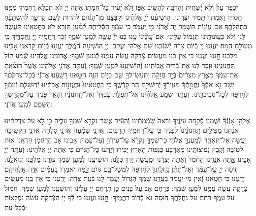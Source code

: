 \documentclass[twoside, openany, parskip=half, 11pt]{book}
\begin{document}
יְֿכַפֵּ֥ר עָוֹן֘ וְֿלֹ֢א יַ֫שְׁחִ֥ית וְֿהִרְבָּ֣ה לְֿהָשִׁ֣יב אַפּ֑וֹ וְֿלֹ֣א יָ֝עִ֗יר כׇּל־חֲמָתֽוֹ׃ אַתָּה יְיָ לֹא תִכְלָא רַחֲמֶיךָ מִמֶּֽנּוּ חַסְדְּֿךָ וַאֲמִתְּֿךָ תָּמִיד יִצְּֿרֽוּנוּ: הֽוֹשִׁיעֵ֨נוּ יְ֘יָ֤ אֱלֹהֵ֗ינוּ וְֿקַבְּֿצֵנוּ֘ מִן־הַגּ֫וֹיִ֥ם לְֿ֭הֹדוֹת לְֿשֵׁ֣ם קָדְֿשֶׁ֑ךָ לְֿ֝הִשְׁתַּבֵּ֗חַ בִּתְהִלָּתֶֽךָ׃
אִם־עֲוֹנ֥וֹת תִּשְׁמָר־יָ֑הּ אֲ֝דֹנָ֗י מִ֣י יַֽעֲמֹֽד׃ כִּֽי־עִמְּֿךָ֥ הַסְּֿלִיחָ֑ה לְֿ֝מַ֗עַן תִּוָּרֵֽא׃ לֹא כַחֲטָאֵֽינוּ תַּעֲשֶׂה לָּנוּ וְֿלֹא כַעֲוֹנוֹתֵֽינוּ תִּגְמוֹל עָלֵינוּ:
אִם־עֲוֹנֵ֨ינוּ֙ עָ֣נוּ בָ֔נוּ יְיָ֕ עֲשֵׂ֖ה לְֿמַ֣עַן שְֿׁמֶ֑ךָ זְֿכֹ֤ר רַֽחֲמֶ֣יךָ יְ֖יָ וַֽחֲסָדֶ֑יךָ כִּ֖י מֵֽעוֹלָ֣ם הֵֽמָּה׃ יַעֲנֵֽנוּ יְיָ בְּֿיוֹם צָרָה יְֿשַׂגְּֿבֵֽנוּ שֵׁם אֱלֹהֵי יַעֲקֹב:
יְיָ֥ הוֹשִׁ֑יעָה הַ֝מֶּֽ֗לֶךְ יַֽעֲנֵ֥נוּ בְֿיֽוֹם־קׇרְאֵֽנוּ׃
אָבִֽינוּ מַלְכֵּֽנוּ חׇׇׇׇָנֵּֽנוּ וַעֲנֵֽנוּ כִּי אֵין בָּֽנוּ מַעֲשִׂים צְֿדָקָה עֲשֵׂה עִמָּֽנוּ לְֿמַעַן שְֿׁמֶךָ:
אֲדוֹנֵֽינוּ אֱלֹהֵֽינוּ שְֿׁמַע קוֹל תַּחֲנוּנֵֽינוּ וּזְכָר לָנוּ אֶת־בְּֿרִית אֲבוֹתֵֽינוּ וְֿהוֹשִׁיעֵֽנוּ לְֿמַֽעַן שְֿׁמֶךָ:
וְֿעַתָּ֣ה אֲדֹנָ֣י אֱלֹהֵ֗ינוּ אֲשֶׁר֩ הוֹצֵ֨אתָ אֶֽת־עַמְּֿךָ֜ מֵאֶ֤רֶץ מִצְרַ֨יִם֙ בְּֿיָ֣ד חֲזָקָ֔ה וַתַּֽעַשׂ־לְךָ֥ שֵׁ֖ם כַּיּ֣וֹם הַזֶּ֑ה חָטָ֖אנוּ רָשָֽׁעְֿנוּ׃
אֲדֹנָ֗י כְּֿכׇל־צִדְקֹתֶ֨ךָ֙ יָֽשָׁב־נָ֤א אַפְּֿךָ֙ וַֽחֲמָ֣תְֿךָ֔ מֵעִֽירְֿךָ֥ יְֿרֽוּשָׁלַ֖ם הַר־קָדְֿשֶׁ֑ךָ כִּ֤י בַֽחֲטָאֵ֨ינוּ֙ וּבַֽעֲוֹנ֣וֹת אֲבֹתֵ֔ינוּ יְֿרֽוּשָׁלַ֧ם וְֿעַמְּֿךָ֛ לְֿחֶרְפָּ֖ה לְֿכׇל־סְבִֽיבֹתֵֽינוּ:
וְֿעַתָּ֣ה שְֿׁמַ֣ע אֱלֹהֵ֗ינוּ אֶל־תְּֿפִלַּ֤ת עַבְדְּֿךָ֙ וְֿאֶל־תַּֽחֲנוּנָ֔יו וְֿהָאֵ֣ר פָּנֶ֔יךָ עַל־מִקְדָּֽשְֿׁךָ֖ הַשָּׁמֵ֑ם לְֿמַ֖עַן אֲדֹנָֽי:

אֱלֹהַ֥י אָזְֿנְֿךָ֘ וּֽשֲׁמָע֒ פְּֿקַ֣חה עֵינֶ֗יךָ וּרְאֵה֙ שֹֽׁמְֿמֹתֵ֔ינוּ וְֿהָעִ֕יר אֲשֶׁר־נִקְרָ֥א שִׁמְךָ֖ עָלֶ֑יהָ כִּ֣י לֹ֣א עַל־צִדְקֹתֵ֗ינוּ אֲנַ֨חְנוּ מַפִּילִ֤ים תַּֽחֲנוּנֵ֨ינוּ֙ לְֿפָנֶ֔יךָ כִּ֖י עַל־רַֽחֲמֶ֥יךָ הָרַבִּֽים: אֲדֹנָ֤י שְֿׁמָ֨עָה֙ אֲדֹנָ֣י סְֿלָ֔חָה אֲדֹנָ֛י הַקְשִׁ֥יבָה וַֽעֲשֵׂ֖ה אַל־תְּֿאַחַ֑ר לְֿמַֽעֲנְךָ֣ אֱלֹהַ֔י כִּֽי־שִׁמְךָ֣ נִקְרָ֔א עַל־עִֽירְֿךָ֖ וְֿעַל־עַמֶּֽךָ: אָבִֽינוּ אָב הָרַחֲמָן הַרְאֵֽנוּ אוֹת לְֿטוֹבָה וְֿקַבֵּץ נְֿפוּצוֹתֵֽינוּ מֵאַרְבַּע כַּנְפוֹת הָאָרֶץ יַכִּירוּ וְֿיֵדְעוּ כׇּל־הַגּוֹיִם כִּי אַתָּה יְיָ אֱלֹהֵֽינוּ:
וְֿעַתָּ֥ה יְֿיָ֖ אָבִ֣ינוּ אׇׇׇָֽתָּה אֲנַ֤חְנוּ הַחֹ֨מֶר֙ וְֿאַתָּ֣ה יֹֽצְֿרֵ֔נוּ וּמַֽעֲשֵׂ֥ה יָדְֿךָ֖ כֻּלָּֽנוּ: הוֹשִׁיעֵֽנוּ לְֿמַעַן שְֿׁמֶךָ צוּרֵֽנוּ מַלְכֵּֽנוּ וְֿגוֹאֲלֵֽנוּ:
ח֧וּסָה יְֿיָ֣ עַל־עַמֶּ֗ךָ וְֿאַל־תִּתֵּ֨ן נַֽחֲלָֽתְֿךָ֤ לְֿחֶרְפָּה֙ לִמְשָׁל־בָּ֣ם גּוֹיִ֔ם לׇׇָ֚מָּה יֹֽאמְֿר֣וּ בָֽעַמִּ֔ים אַיֵּ֖ה אֱלֹֽהֵיהֶֽם׃ יָדַֽעְנוּ כִּי חָטָֽאנוּ וְֿאֵין מִי יַעֲמֹד בַּעֲדֵֽנוּ שִׁמְךָ הַגָּדוֹל יַעֲמָד לָֽנוּ בְּֿעֵת צָרָה: יָדַֽעְנוּ כִּי אֵין בָּֽנוּ מַעֲשִׂים צְֿדָקָה עֲשֵׂה עִמָּֽנוּ לְֿמַעַן שְֿׁמֶֽךָ: כְּֿרַחֵם אָב עַל בָּנִים כֵּן תְּֿרַחֵם יְיָ עָלֵינוּ וְֿהוֹשִׁעֵֽנוּ לְֿמַעַן שְֿׁמֶךָ: חֲמוֹל עַל עַמֶּֽךָ רַחֵם עַל נַחֲלָתֶֽךָ חֽוּסָה נָּא כְּֿרוֹב רַחֲמֶיךָ: חׇׇׇׇָנֵּֽנוּ וַעֲנֵֽנוּ כִּי לְֿךָ יְיָ הַצְּֿדָקָה עֹשֵׂה נִפְלָאוֹת בְּֿכׇל־עֵת:
\end{document}
